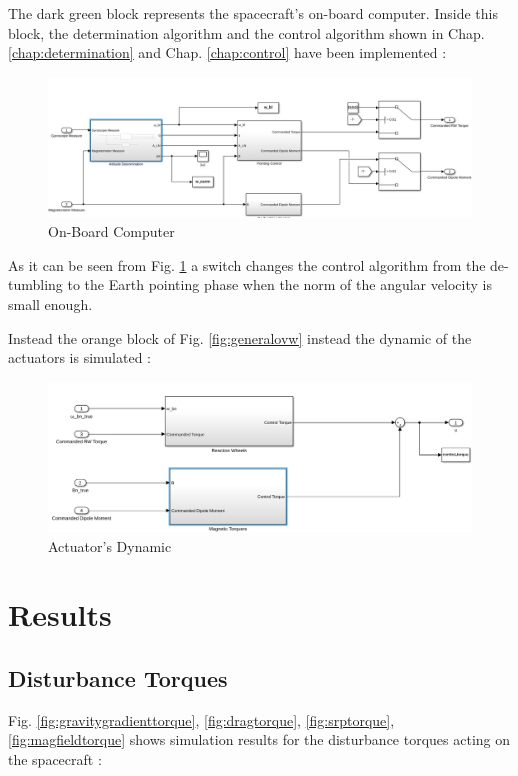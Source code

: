 \documentclass[11pt,a4paper]{report}
\begin{document}
The dark green block represents the spacecraft's on-board computer. Inside this block, the determination algorithm and the control algorithm shown in Chap. \ref{chap:determination} and Chap. \ref{chap:control} have been implemented : 

\begin{figure}[H]
 \centering
 \includegraphics[scale=0.4]{gfx/simulink/computer.png}
 \caption{On-Board Computer} 
 \label{fig:computer}
\end{figure}


As it can be seen from Fig. \ref{fig:computer} a switch changes the control algorithm from the de-tumbling to the Earth pointing phase when the norm of the angular velocity is small enough.

Instead the orange block of Fig. \ref{fig:generalovw} instead the dynamic of the actuators is simulated :

\begin{figure}[H]
 \centering
 \includegraphics[scale=0.4]{gfx/simulink/actuators_inside.png}
 \caption{Actuator's Dynamic} 
 \label{fig:actuatordynamics}
\end{figure}

\chapter{Results}

\section{Disturbance Torques}
Fig. \ref{fig:gravitygradienttorque}, \ref{fig:dragtorque}, \ref{fig:srptorque}, \ref{fig:magfieldtorque} shows simulation results for the disturbance torques acting on the spacecraft : 
\end{document}

